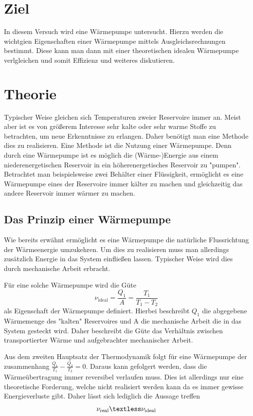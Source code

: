 \section{Ziel}
\label{sec:Ziel}
In diesem Versuch wird eine Wärmepumpe untersucht. Hierzu werden die wichtgien Eigenschaften einer Wärmepumpe mittels Ausgleichsrechnungen bestimmt. Diese kann man dann mit einer 
theoretischen idealen Wärmepumpe verlgleichen und somit Effizienz und weiteres diskutieren.
\section{Theorie}
\label{sec:Theorie}
Typischer Weise gleichen sich Temperaturen zweier Reservoire immer an. Meist aber ist es von größerem Interesse sehr kalte oder sehr warme Stoffe zu betrachten, um neue Erkenntnisse
zu erlangen. Daher benötigt man eine Methode dies zu realisieren. Eine Methode ist die Nutzung einer Wärmepumpe. Denn durch eine Wärmepumpe ist es möglich die (Wärme-)Energie aus 
einem niederenergetischen Reservoir in ein höherenergetisches Reservoir zu "pumpen". Betrachtet man beispielsweise zwei Behälter einer Flüssigkeit, ermöglicht es eine Wärmepumpe 
eines der Reservoire immer kälter zu machen und gleichzeitig das andere Reservoir immer wärmer zu machen.
\subsection{Das Prinzip einer Wärmepumpe}
\label{subsec:Prinzip}
Wie bereits erwähnt ermöglicht es eine Wärmepumpe die natürliche Flussrichtung der Wärmeenergie umzukehren. Um dies zu realisieren muss man allerdings zusätzlich Energie in das System
einfließen lassen. Typischer Weise wird dies durch mechanische Arbeit erbracht.


Für eine solche Wärmepumpe wird die Güte
\begin{equation}
    \label{eqn:Güte_ideal}
    \nu_{\text{ideal}} = \frac{Q_1}{A} = \frac{T_1}{T_1 - T_2}
\end{equation}
als Eigenschaft der Wärmepumpe definiert. Hierbei beschreibt $Q_1$ die abgegebene Wärmemenge des "kalten" Reservoires und A die mechanische Arbeit die in das System gesteckt wird.
Daher beschreibt die Güte das Verhältnis zwischen transportierter Wärme und aufgebrachter mechanischer Arbeit. 


Aus dem zweiten Hauptsatz der Thermodynamik folgt für eine Wärmepumpe der zusammenhang $\frac{Q_1}{T_1} - \frac{Q_2}{T_2} = 0$. Daraus kann gefolgert werden, dass die Wärmeübertragung 
immer reversibel verlaufen muss. Dies ist allerdings nur eine theoretische Forderung, welche nicht realisiert werden kann da es immer gewisse Energieverluste gibt. Daher lässt sich
lediglich die Aussage treffen 
\begin{equation*}
    \label{eqn:Güte_real}
    \nu_{\text{real}} \textless \nu_{\text{ideal}}
\end{equation*}

